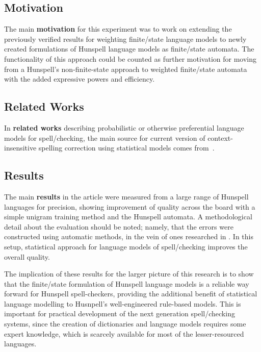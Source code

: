 \documentclass[officiallayout,final]{unihelcompling}
\begin{document}
\subsection{Motivation}

The main \textbf{motivation} for this experiment was to work on extending the
previously verified results for weighting finite\-/state language models to newly
created formulations of Hunspell language models as finite\-/state automata. The
functionality of this approach could be counted as further motivation for
moving from a Hunspell's non-finite-state approach to weighted finite\-/state automata with
the added expressive powers and efficiency.

\subsection{Related Works}

In \textbf{related works} describing probabilistic or otherwise preferential
language models for spell\-/checking, the main source for current version of 
context-insensitive spelling correction using statistical models comes
from~\citet{church1991probability}.

\subsection{Results}

The main \textbf{results} in the article were measured from a large range of
Hunspell languages for precision, showing improvement of quality across the
board with a simple unigram training method and the Hunspell automata. A
methodological detail about the evaluation should be noted; namely, that the errors were
constructed using automatic methods, in the vein of ones researched in
\citep{bigert2003autoeval,bigert2005automatic}. In this setup, statistical approach for language models of spell\-/checking improves
the overall quality.

The implication of these results for the larger picture of this research is to
show that the finite\-/state formulation of Hunspell language models is a
reliable way forward for Hunspell spell-checkers, providing the additional
benefit of statistical language modelling to Husnpell's well-engineered
rule-based models. This is important for practical development of the next
generation spell\-/checking systems, since the creation of dictionaries and
language models requires some expert knowledge, which is scarcely available for
most of the lesser-resourced languages.
\end{document}
